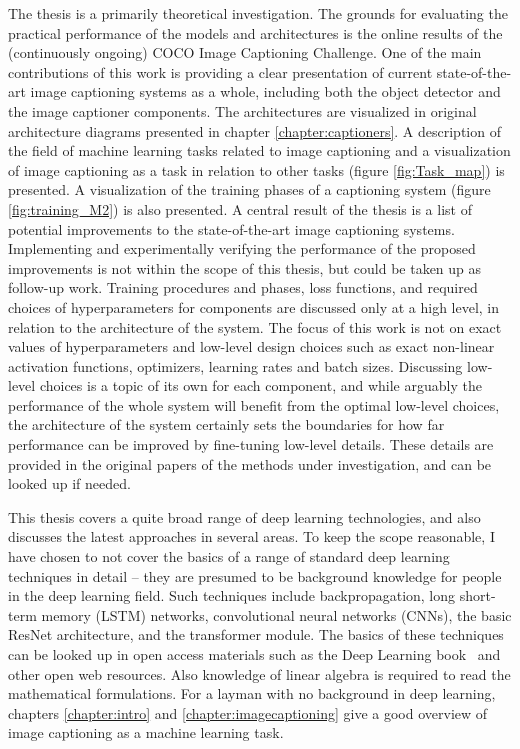 \documentclass[english,twoside,openright]{HYgraduMLDS}
\begin{document}
The thesis is a primarily theoretical investigation. The grounds for evaluating the practical performance of the models and architectures is the online results of the (continuously ongoing) COCO Image Captioning Challenge. One of the main contributions of this work is providing a clear presentation of current state-of-the-art image captioning systems as a whole, including both the object detector and the image captioner components. The architectures are visualized in original architecture diagrams presented in chapter \ref{chapter:captioners}. A description of the field of machine learning tasks related to image captioning and a visualization of image captioning as a task in relation to other tasks (figure \ref{fig:Task_map}) is presented. A visualization of the training phases of a captioning system (figure \ref{fig:training_M2}) is also presented. A central result of the thesis is a list of potential improvements to the state-of-the-art image captioning systems. Implementing and experimentally verifying the performance of the proposed improvements is not within the scope of this thesis, but could be taken up as follow-up work. Training procedures and phases, loss functions, and required choices of hyperparameters for components are discussed only at a high level, in relation to the architecture of the system. The focus of this work is not on exact values of hyperparameters and low-level design choices such as exact non-linear activation functions, optimizers, learning rates and batch sizes. Discussing low-level choices is a topic of its own for each component, and while arguably the performance of the whole system will benefit from the optimal low-level choices, the architecture of the system certainly sets the boundaries for how far performance can be improved by fine-tuning low-level details. These details are provided in the original papers of the methods under investigation, and can be looked up if needed.

This thesis covers a quite broad range of deep learning technologies, and also discusses the latest approaches in several areas. To keep the scope reasonable, I have chosen to not cover the basics of a range of standard deep learning techniques in detail -- they are presumed to be background knowledge for people in the deep learning field. Such techniques include backpropagation, long short-term memory (LSTM) networks, convolutional neural networks (CNNs), the basic ResNet architecture, and the transformer module. The basics of these techniques can be looked up in open access materials such as the Deep Learning book~\cite{DeepLearningBook} and other open web resources. Also knowledge of linear algebra is required to read the mathematical formulations. For a layman with no background in deep learning, chapters \ref{chapter:intro} and \ref{chapter:imagecaptioning} give a good overview of image captioning as a machine learning task.
\end{document}
